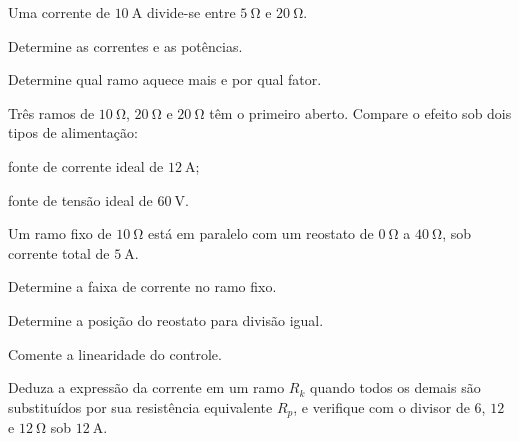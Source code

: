 \begin{questao}[3]{}

Uma corrente de $\SI{10}{\ampere}$ divide-se entre $\SI{5}{\ohm}$ e
$\SI{20}{\ohm}$.
\begin{itensq}
\item Determine as correntes e as potências.
\item Determine qual ramo aquece mais e por qual fator.
\end{itensq}


\end{questao}
\begin{questao}[3]{}

Três ramos de $\SI{10}{\ohm}$, $\SI{20}{\ohm}$ e $\SI{20}{\ohm}$ têm o
primeiro aberto. Compare o efeito sob dois tipos de alimentação:
\begin{itensq}
\item fonte de corrente ideal de $\SI{12}{\ampere}$;
\item fonte de tensão ideal de $\SI{60}{\volt}$.
\end{itensq}


\end{questao}
\begin{questao}[3]{}

Um ramo fixo de $\SI{10}{\ohm}$ está em paralelo com um reostato de
$\SI{0}{\ohm}$ a $\SI{40}{\ohm}$, sob corrente total de $\SI{5}{\ampere}$.
\begin{itensq}
\item Determine a faixa de corrente no ramo fixo.
\item Determine a posição do reostato para divisão igual.
\item Comente a linearidade do controle.
\end{itensq}


\end{questao}
\begin{questao}[3]{}

Deduza a expressão da corrente em um ramo $R_k$ quando todos os demais são
substituídos por sua resistência equivalente $R_p$, e verifique com o divisor de
$6$, $12$ e $\SI{12}{\ohm}$ sob $\SI{12}{\ampere}$.


\end{questao}
